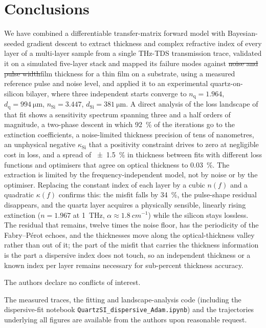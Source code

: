 \documentclass{optica-article}
\DeclareRobustCommand{\chg}[1]{{\color{blue}#1}}
\DeclareRobustCommand{\del}[1]{{\color{red}\sout{#1}}}
\newcommand{\kap}{\kappa}
\begin{document}
\section{Conclusions}\label{sec:conclusions}
We have combined a differentiable transfer-matrix forward model with Bayesian-seeded gradient descent to extract thickness and complex refractive index of every layer of a multi-layer sample from a single THz-TDS transmission trace, validated it on a simulated five-layer stack and mapped its failure modes against \del{noise and pulse width}\chg{film thickness for a thin film on a substrate, using a measured reference pulse and noise level}, and applied it to an experimental quartz-on-silicon bilayer, where three independent starts converge to $n_{\mathrm{q}}=1.964$, $d_{\mathrm{q}}=\SI{994}{\micro\metre}$, $n_{\mathrm{Si}}=3.447$, $d_{\mathrm{Si}}=\SI{381}{\micro\metre}$. A direct analysis of the loss landscape of that fit shows a sensitivity spectrum spanning three and a half orders of magnitude, a two-phase descent in which \SI{92}{\percent} of the iterations go to the extinction coefficients, a noise-limited thickness precision of tens of nanometres, an unphysical negative $\kap_{\mathrm{Si}}$ that a positivity constraint drives to zero at negligible cost in loss, and a spread of \SI{\pm1.5}{\percent} in thickness between fits with different loss functions and optimisers that agree on optical thickness to \SI{0.03}{\percent}. The extraction is limited by the frequency-independent model, not by noise or by the optimiser. Replacing the constant index of each layer by a cubic $n(f)$ and a quadratic $\kap(f)$ confirms this: the misfit falls by \SI{34}{\percent}, the pulse-shape residual disappears, and the quartz layer acquires a physically sensible, linearly rising extinction ($n=1.967$ at \SI{1}{THz}, $\alpha\approx\SI{1.8}{cm^{-1}}$) while the silicon stays lossless. The residual that remains, twelve times the noise floor, has the periodicity of the Fabry--P\'erot echoes, and the thicknesses move along the optical-thickness valley rather than out of it; the part of the misfit that carries the thickness information is the part a dispersive index does not touch, so an independent thickness or a known index per layer remains necessary for sub-percent thickness accuracy.


\begin{backmatter}
 \todo{[to be added]}

 \todo{[to be added]}

 The authors declare no conflicts of interest. 

 The measured traces, the fitting and landscape-analysis code (including the dispersive-fit notebook \texttt{QuartzSI\_\-dispersive\_\-Adam.ipynb}) and the trajectories underlying all figures are available from the authors upon reasonable request. 
\end{backmatter}


\end{document}
